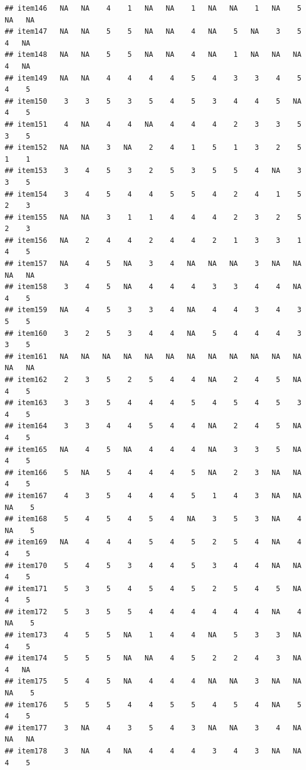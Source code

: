 \documentclass[
  man]{apa6}
\begin{document}
\begin{verbatim}
## item146   NA   NA    4    1   NA   NA    1   NA   NA    1   NA    5   NA   NA
## item147   NA   NA    5    5   NA   NA    4   NA    5   NA    3    5    4   NA
## item148   NA   NA    5    5   NA   NA    4   NA    1   NA   NA   NA    4   NA
## item149   NA   NA    4    4    4    4    5    4    3    3    4    5    4    5
## item150    3    3    5    3    5    4    5    3    4    4    5   NA    4    5
## item151    4   NA    4    4   NA    4    4    4    2    3    3    5    3    5
## item152   NA   NA    3   NA    2    4    1    5    1    3    2    5    1    1
## item153    3    4    5    3    2    5    3    5    5    4   NA    3    3    5
## item154    3    4    5    4    4    5    5    4    2    4    1    5    2    3
## item155   NA   NA    3    1    1    4    4    4    2    3    2    5    2    3
## item156   NA    2    4    4    2    4    4    2    1    3    3    1    4    5
## item157   NA    4    5   NA    3    4   NA   NA   NA    3   NA   NA   NA   NA
## item158    3    4    5   NA    4    4    4    3    3    4    4   NA    4    5
## item159   NA    4    5    3    3    4   NA    4    4    3    4    3    5    5
## item160    3    2    5    3    4    4   NA    5    4    4    4    3    3    5
## item161   NA   NA   NA   NA   NA   NA   NA   NA   NA   NA   NA   NA   NA   NA
## item162    2    3    5    2    5    4    4   NA    2    4    5   NA    4    5
## item163    3    3    5    4    4    4    5    4    5    4    5    3    4    5
## item164    3    3    4    4    5    4    4   NA    2    4    5   NA    4    5
## item165   NA    4    5   NA    4    4    4   NA    3    3    5   NA    4    5
## item166    5   NA    5    4    4    4    5   NA    2    3   NA   NA    4    5
## item167    4    3    5    4    4    4    5    1    4    3   NA   NA   NA    5
## item168    5    4    5    4    5    4   NA    3    5    3   NA    4   NA    5
## item169   NA    4    4    4    5    4    5    2    5    4   NA    4    4    5
## item170    5    4    5    3    4    4    5    3    4    4   NA   NA    4    5
## item171    5    3    5    4    5    4    5    2    5    4    5   NA    4    5
## item172    5    3    5    5    4    4    4    4    4    4   NA    4   NA    5
## item173    4    5    5   NA    1    4    4   NA    5    3    3   NA    4    5
## item174    5    5    5   NA   NA    4    5    2    2    4    3   NA    4   NA
## item175    5    4    5   NA    4    4    4   NA   NA    3   NA   NA   NA    5
## item176    5    5    5    4    4    5    5    4    5    4   NA    5    4    5
## item177    3   NA    4    3    5    4    3   NA   NA    3    4   NA   NA   NA
## item178    3   NA    4   NA    4    4    4    3    4    3   NA   NA    4    5

\end{verbatim}
\end{document}
